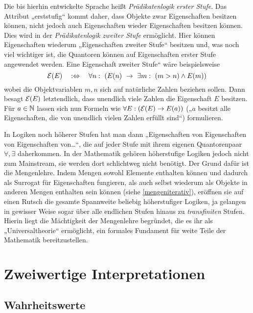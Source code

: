 \begin{vorschau} \label{higherorder}
    Die bis hierhin entwickelte Sprache heißt \emph{Prädikatenlogik erster Stufe}. Das Attribut „erststufig“ kommt daher, dass Objekte zwar Eigenschaften besitzen können, nicht jedoch auch Eigenschaften wieder Eigenschaften besitzen können. Dies wird in der \emph{Prädikatenlogik zweiter Stufe} ermöglicht. Hier können Eigenschaften wiederum „Eigenschaften zweiter Stufe“ besitzen und, was noch viel wichtiger ist, die Quantoren können auf Eigenschaften erster Stufe angewendet werden. Eine Eigenschaft zweiter Stufe“ wäre beispielsweise
        \[ \calE(E) \quad:\Leftrightarrow\quad \forall n:\ (E(n)\ \to\ \exists m:\ (m>n)\land E(m)) \]
    wobei die Objektvariablen $m,n$ sich auf natürliche Zahlen beziehen sollen. Dann besagt $\mathcal E(E)$ letztendlich, dass unendlich viele Zahlen die Eigenschaft $E$ besitzen. Für $a\in \mathbb N$ lassen sich nun Formeln wie $\forall E:(\mathcal E(E)\to E(a))$ („$a$ besitzt alle Eigenschaften, die von unendlich vielen Zahlen erfüllt sind“) formulieren.

    In Logiken noch höherer Stufen hat man dann „Eigenschaften von Eigenschaften von Eigenschaften von\dots“, die auf jeder Stufe mit ihrem eigenen Quantorenpaar $\forall,\exists$ daherkommen. In der Mathematik gehören höherstufige Logiken jedoch nicht zum Mainstream, sie werden dort schlichtweg nicht benötigt. Der Grund dafür ist die Mengenlehre. Indem Mengen sowohl Elemente enthalten können und dadurch als Surrogat für Eigenschaften fungieren, als auch selbst wiederum als Objekte in anderen Mengen enthalten sein können (siehe \cref{mengeniterativ}), eröffnen sie auf einen Rutsch die gesamte Spannweite beliebig höherstufiger Logiken, ja gelangen in gewisser Weise sogar über alle endlichen Stufen hinaus zu \emph{transfiniten} Stufen. Hierin liegt die Mächtigkeit der Mengenlehre begründet, die es ihr als „Universaltheorie“ ermöglicht, ein formales Fundament für weite Teile der Mathematik bereitzustellen.
\end{vorschau}





\section{Zweiwertige Interpretationen}


\subsection*{Wahrheitswerte}


